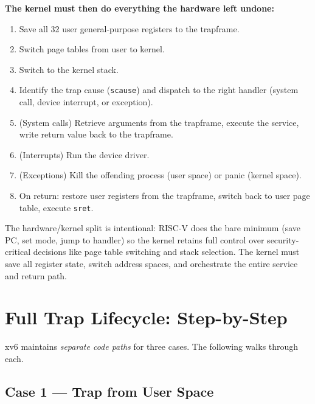 \documentclass[11pt, a4paper]{article}
\begin{document}
\begin{tcolorbox}[kernel]
\textbf{The kernel must then do everything the hardware left undone:}
\begin{enumerate}[leftmargin=1.8em, itemsep=0.15em]
  \item Save all 32 user general-purpose registers to the trapframe.
  \item Switch page tables from user to kernel.
  \item Switch to the kernel stack.
  \item Identify the trap cause (\lstinline|scause|) and dispatch to the right handler (system call, device interrupt, or exception).
  \item (System calls) Retrieve arguments from the trapframe, execute the service, write return value back to the trapframe.
  \item (Interrupts) Run the device driver.
  \item (Exceptions) Kill the offending process (user space) or panic (kernel space).
  \item On return: restore user registers from the trapframe, switch back to user page table, execute \lstinline|sret|.
\end{enumerate}
\end{tcolorbox}

\begin{tcolorbox}[summary, title={Section Summary}]
The hardware/kernel split is intentional: RISC-V does the bare minimum (save PC, set mode, jump to handler) so the kernel retains full control over security-critical decisions like page table switching and stack selection. The kernel must save all register state, switch address spaces, and orchestrate the entire service and return path.
\end{tcolorbox}

\section{Full Trap Lifecycle: Step-by-Step}

xv6 maintains \emph{separate code paths} for three cases. The following walks through each.

\subsection{Case 1 — Trap from User Space}
\end{document}
